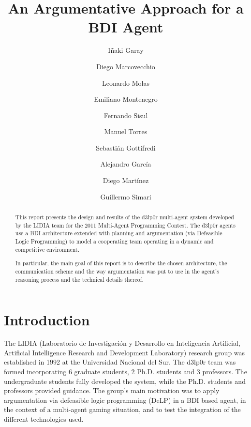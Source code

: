 \documentclass{llncs2e/llncs}
\title{An Argumentative Approach for a BDI Agent} %
\author{I\~{n}aki Garay \and 
        Diego Marcovecchio \and
        Leonardo Molas \and
        Emiliano Montenegro \and
        Fernando Sisul \and
        Manuel Torres \and
        Sebastián Gottifredi \and
        Alejandro García \and
        Diego Martínez \and
        Guillermo Simari
        }
\institute{Universidad Nacional del Sur}
\begin{document}
\frontmatter %

\maketitle

\begin{abstract}
    This report presents the design and results of the d3lp0r multi-agent system 
    developed by the LIDIA team for the 2011 Multi-Agent Programming Contest.
    The d3lp0r agents use a BDI architecture extended with planning and 
    argumentation (via Defeasible Logic Programming) to model a cooperating team 
    operating in a dynamic and competitive environment.

    In particular, the main goal of this report is to describe the chosen 
    architecture, the communication scheme and the way argumentation was put to 
    use in the agent's reasoning process and the technical details thereof.
\end{abstract}

\section{Introduction}

    The LIDIA (Laboratorio de Investigación y Desarrollo en Inteligencia 
    Artificial, Artificial Intelligence Research and Development Laboratory) 
    research group was established in 1992 at the Universidad Nacional del Sur. 
    The d3lp0r team was formed incorporating 6 graduate students, 2 Ph.D. students 
    and 3 professors. The undergraduate students fully developed the system, while 
    the Ph.D. students and professors provided guidance. The group's main 
    motivation was to apply argumentation via defeasible logic programming (DeLP) 
    in a BDI based agent, in the context of a multi-agent gaming situation, and to 
    test the integration of the different technologies used.
\end{document}
